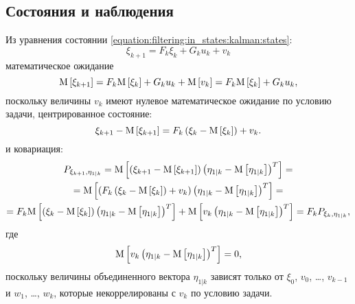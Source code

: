 \subsection{Состояния и наблюдения}

Из уравнения состоянии \eqref{equation:filtering:in_states:kalman:states}:
$$
	\xi_{k+1} = F_k \xi_k + G_k u_k + v_k
$$
математическое ожидание
\begin{equation} \label{equation:filtering:in_states:kalman:states_and_observations:state_expectation}
	\mathrm{M} \left [ \xi_{k+1} \right ]
		= F_k \mathrm{M} \left [ \xi_k \right ] + G_k u_k + \mathrm{M} \left [ v_k \right ]
		= F_k \mathrm{M} \left [ \xi_k \right ] + G_k u_k
	,
\end{equation}
поскольку величины $v_k$ имеют нулевое математическое ожидание по условию задачи, центрированное состояние:
$$
	\xi_{k+1} - \mathrm{M} \left [ \xi_{k+1} \right ] = F_k \left ( \xi_k - \mathrm{M} \left [ \xi_k \right ] \right ) + v_k .
$$
и ковариация:
\begin{multline} \label{equation:filtering:in_states:kalman:states_and_observations:state_and_observations_covariance}
	P_{\xi_{k+1}, \eta_{1|k}}
		= \mathrm{M} \left [ \left ( \xi_{k+1} - \mathrm{M} \left [ \xi_{k+1} \right ] \right ) \left ( \eta_{1|k} - \mathrm{M} \left [ \eta_{1|k} \right ] \right )^T \right ] = \\
	= \mathrm{M} \left [   \left ( F_k \left ( \xi_k - \mathrm{M} \left [ \xi_k \right ] \right ) + v_k \right ) \left ( \eta_{1|k} - \mathrm{M} \left [ \eta_{1|k} \right ] \right )^T  \right ] = \\
	= F_k \mathrm{M} \left [ \left ( \xi_k - \mathrm{M} \left [ \xi_k \right ] \right ) \left ( \eta_{1|k} - \mathrm{M} \left [ \eta_{1|k} \right ] \right )^T \right ] + \mathrm{M} \left [  v_k \left ( \eta_{1|k} - \mathrm{M} \left [ \eta_{1|k} \right ] \right )^T  \right ]
		= F_k P_{\xi_{k}, \eta_{1|k}}
	,
\end{multline}
где
$$
	\mathrm{M} \left [  v_k \left ( \eta_{1|k} - \mathrm{M} \left [ \eta_{1|k} \right ] \right )^T  \right ] = 0 ,
$$
поскольку величины объединенного вектора $\eta_{1|k}$ зависят только от $\xi_0$, $v_0$, \dots, $v_{k-1}$ и $w_1$, \dots, $w_k$, которые некоррелированы с $v_k$
по условию задачи.

